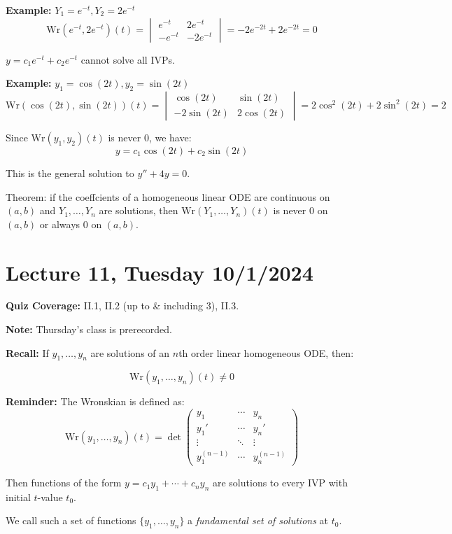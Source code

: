 \documentclass{article}
\begin{document}
\textbf{Example:} \( Y_1 = e^{-t}, Y_2 = 2e^{-t} \)
\[
\text{Wr}(e^{-t}, 2e^{-t})(t) = \begin{vmatrix}
e^{-t} & 2e^{-t} \\
-e^{-t} & -2e^{-t}
\end{vmatrix}
= -2e^{-2t} + 2e^{-2t} = 0
\]

\( y = c_1 e^{-t} + c_2 e^{-t} \) cannot solve all IVPs.

\textbf{Example:} \( y_1 = \cos(2t), y_2 = \sin(2t) \)
\[
\text{Wr}(\cos(2t), \sin(2t))(t) = \begin{vmatrix}
\cos(2t) & \sin(2t) \\
-2\sin(2t) & 2\cos(2t)
\end{vmatrix}
= 2\cos^2(2t) + 2\sin^2(2t) = 2
\]

Since \( \text{Wr}(y_1, y_2)(t) \) is never 0, we have:
\[
y = c_1 \cos(2t) + c_2 \sin(2t)
\]

This is the general solution to \( y'' + 4y = 0 \).


Theorem: if the coeffcients of a homogeneous linear ODE are continuous on \((a, b)\) and \(Y_1, \ldots, Y_n\) are solutions, then \(\text{Wr}(Y_1, \ldots, Y_n)(t)\) is never 0 on \((a, b)\) or always 0 on \((a, b)\).


\section*{Lecture 11, Tuesday 10/1/2024}

\textbf{Quiz Coverage:} II.1, II.2 (up to \& including 3), II.3.

\textbf{Note:} Thursday's class is prerecorded.

\textbf{Recall:} If $y_1, \ldots, y_n$ are solutions of an $n$th order linear homogeneous ODE, then:

\[
\text{Wr}(y_1, \ldots, y_n)(t) \neq 0
\]

\textbf{Reminder:} The Wronskian is defined as:
\[
\text{Wr}(y_1, \ldots, y_n)(t) = \det 
\begin{pmatrix}
y_1 & \cdots & y_n \\
y_1' & \cdots & y_n' \\
\vdots & \ddots & \vdots \\
y_1^{(n-1)} & \cdots & y_n^{(n-1)}
\end{pmatrix}
\]

Then functions of the form $y = c_1y_1 + \cdots + c_ny_n$ are solutions to every IVP with initial $t$-value $t_0$.

We call such a set of functions $\{y_1, \ldots, y_n\}$ a \textit{fundamental set of solutions} at $t_0$.
\end{document}
